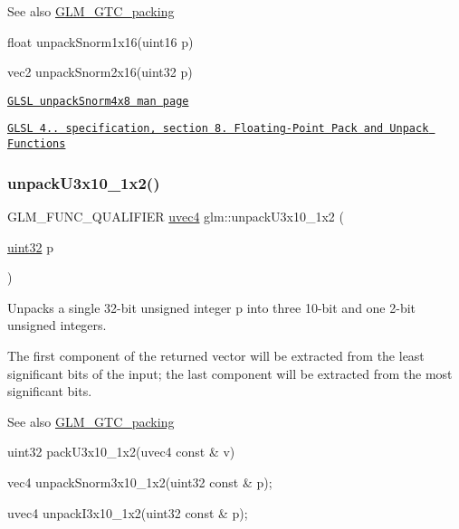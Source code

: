 \begin{DoxySeeAlso}{See also}
\hyperlink{group__gtc__packing}{G\+L\+M\+\_\+\+G\+T\+C\+\_\+packing} 

float unpack\+Snorm1x16(uint16 p) 

vec2 unpack\+Snorm2x16(uint32 p) 

\href{http://www.opengl.org/sdk/docs/manglsl/xhtml/unpackSnorm2x16.xml}{\tt G\+L\+SL unpack\+Snorm4x8 man page} 

\href{http://www.opengl.org/registry/doc/GLSLangSpec.4.20.8.pdf}{\tt G\+L\+SL 4.. specification, section 8. Floating-\/\+Point Pack and Unpack Functions} 
\end{DoxySeeAlso}
\mbox{\label{group__gtc__packing_ga119aa2d7d55952f9dc4214390a6ffefc}} 
\subsubsection{\texorpdfstring{unpack\+U3x10\+\_\+1x2()}{unpackU3x10\_1x2()}}
{\footnotesize\ttfamily G\+L\+M\+\_\+\+F\+U\+N\+C\+\_\+\+Q\+U\+A\+L\+I\+F\+I\+ER \hyperlink{group__core__types_ga1c426d19627b32b14f0089f7f4ba7b1d}{uvec4} glm\+::unpack\+U3x10\+\_\+1x2 (\begin{DoxyParamCaption}\item[{\hyperlink{group__gtc__type__precision_ga202b6a53c105fcb7e531f9b443518451}{uint32}}]{p }\end{DoxyParamCaption})}

Unpacks a single 32-\/bit unsigned integer p into three 10-\/bit and one 2-\/bit unsigned integers.

The first component of the returned vector will be extracted from the least significant bits of the input; the last component will be extracted from the most significant bits.

\begin{DoxySeeAlso}{See also}
\hyperlink{group__gtc__packing}{G\+L\+M\+\_\+\+G\+T\+C\+\_\+packing} 

uint32 pack\+U3x10\+\_\+1x2(uvec4 const \& v) 

vec4 unpack\+Snorm3x10\+\_\+1x2(uint32 const \& p); 

uvec4 unpack\+I3x10\+\_\+1x2(uint32 const \& p); 
\end{DoxySeeAlso}
\mbox{\label{group__gtc__packing_gad3d7e1ec7fcfb7ae341658e2ce1c3bd9}} 

